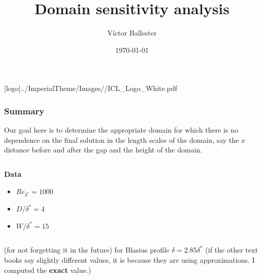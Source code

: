 \documentclass[
	aspectratio=169, %
	t, %
	onlytextwidth, %
	10pt, %
]{beamer}
\title{Domain sensitivity analysis} %
\subtitle{} %
\author{Víctor Ballester} %
\date{\today} %
\def\imagefolder{../ImperialTheme/Images/}
\begin{document}
\begingroup
{} %
[logo]{\imagefolder/ICL_Logo_White.pdf} %
\frame[plain, s]{\titlepage} %
\endgroup

\begin{frame}
	\frametitle{Summary}
	Our goal here is to determine the appropriate domain for which there is no dependence on the final solution in the length scales of the domain, say the $x$ distance before and after the gap and the height of the domain.

	\begin{columns}[T] %
		\begin{column}{0.48\linewidth} %
			\textbf{Data}
			\begin{itemize}
				\item $Re_{\delta^*} = 1000$
				\item $D/\delta^* = 4$
				\item $W/\delta^* = 15$
			\end{itemize}
		\end{column}
	\end{columns}

	(for not forgetting it in the future) for Blasius profile $\delta = 2.85 \delta^*$ (if the other text books say slightly different values, it is because they are using approximations. I computed the \textbf{exact} value.)
\end{frame}
\end{document}
